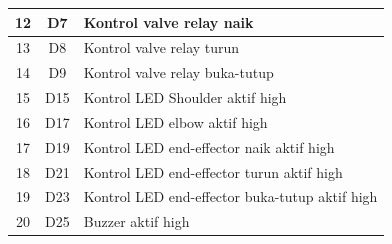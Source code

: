 \begin{table}[H]
\begin{tabular}{|c|c|l|}
		12 & D7                                                                & Kontrol valve relay naik                            \\ \hline
		13 & D8                                                                & Kontrol valve relay turun                           \\ \hline
		14 & D9                                                                & Kontrol valve relay buka-tutup                      \\ \hline
		15 & D15                                                               & Kontrol LED Shoulder aktif high                     \\ \hline
		16 & D17                                                               & Kontrol LED elbow aktif high                        \\ \hline
		17 & D19                                                               & Kontrol LED end-effector naik aktif high            \\ \hline
		18 & D21                                                               & Kontrol LED end-effector turun aktif high           \\ \hline
		19 & D23                                                               & Kontrol LED end-effector buka-tutup aktif high      \\ \hline
		20 & D25                                                               & Buzzer aktif high                                   \\ \hline
	\end{tabular}
\end{table}

